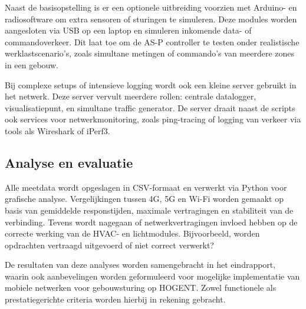 Naast de basisopstelling is er een optionele uitbreiding voorzien met Arduino- en radiosoftware om extra sensoren of sturingen te simuleren. Deze modules worden aangesloten via USB op een laptop en simuleren inkomende data- of commandoverkeer. Dit laat toe om de AS-P controller te testen onder realistische werklastscenario’s, zoals simultane metingen of commando's van meerdere zones in een gebouw.

Bij complexe setups of intensieve logging wordt ook een kleine server gebruikt in het netwerk. Deze server vervult meerdere rollen: centrale datalogger, visualisatiepunt, en simultane traffic generator. De server draait naast de scripts ook services voor netwerkmonitoring, zoals ping-tracing of logging van verkeer via tools als Wireshark of iPerf3.

\subsection{Analyse en evaluatie}

Alle meetdata wordt opgeslagen in CSV-formaat en verwerkt via Python voor grafische analyse. Vergelijkingen tussen 4G, 5G en Wi-Fi worden gemaakt op basis van gemiddelde responstijden, maximale vertragingen en stabiliteit van de verbinding. Tevens wordt nagegaan of netwerkvertragingen invloed hebben op de correcte werking van de HVAC- en lichtmodules. Bijvoorbeeld, worden opdrachten vertraagd uitgevoerd of niet correct verwerkt?

De resultaten van deze analyses worden samengebracht in het eindrapport, waarin ook aanbevelingen worden geformuleerd voor mogelijke implementatie van mobiele netwerken voor gebouwsturing op HOGENT. Zowel functionele als prestatiegerichte criteria worden hierbij in rekening gebracht.



